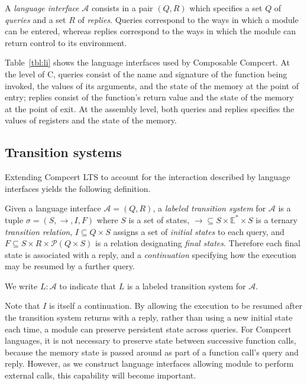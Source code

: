 \begin{definition}
A \emph{language interface} $\mathcal{A}$ consists in a pair $(Q, R)$
which specifies
a set $Q$ of \emph{queries} and
a set $R$ of \emph{replies}.
Queries
correspond to the ways in which
a module can be entered, whereas
replies
correspond to the ways in which
the module can return control
to its environment.
\end{definition}

Table~\ref{tbl:li}
shows the language interfaces used by Composable Compcert.
At the level of C,
queries consist of
the name and signature of the function being invoked,
the values of its arguments,
and the state of the memory at the point of entry;
replies
consist of the function's return value
and the state of the memory at the point of exit.
At the assembly level,
both queries and replies specifies
the values of registers and the state of the memory.


\subsection{Transition systems} %


Extending Compcert LTS to account for
the interaction described by language interfaces
yields the following definition.

\begin{definition}
Given a language interface $\mathcal{A} = (Q, R)$,
a \emph{labeled transition system} for $\mathcal{A}$
is a tuple $\sigma = (S, \rightarrow, I, F)$ where
$S$ is a set of states,
${\rightarrow} \subseteq S \times \mathbb{E}^* \times S$
is a ternary \emph{transition relation},
$I \subseteq Q \times S$
assigns a set of \emph{initial states} to each query, and
$F \subseteq S \times R \times \mathcal{P}(Q \times S)$
is a relation designating \emph{final states}.
Therefore each final state is associated with a reply,
and a \emph{continuation} specifying
how the execution may be resumed by a further query.

We write $L : \mathcal{A}$ to indicate that
$L$ is a labeled transition system for $\mathcal{A}$.
\end{definition}

Note that $I$ is itself a continuation.
By allowing the execution to be resumed
after the transition system returns with a reply,
rather than using a new initial state each time,
a module can preserve persistent state across queries.
For Compcert languages,
it is not necessary to preserve state between successive function calls,
because the memory state is passed around
as part of a function call's query and reply.
However,
as we construct language interfaces
allowing module to perform external calls,
this capability will become important.

